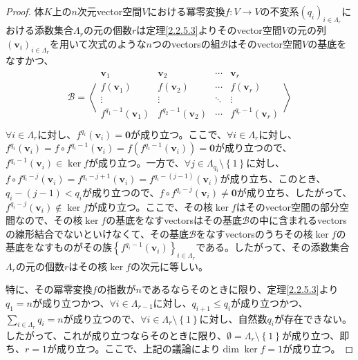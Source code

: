 \documentclass[dvipdfmx]{jsarticle}
\begin{document}
\begin{proof}
体$K$上の$n$次元vector空間$V$における冪零変換$f:V \rightarrow V$の不変系$\left( q_{i} \right)_{i \in \varLambda_{r}}$における添数集合$\varLambda_{r}$の元の個数$r$は定理\ref{2.2.5.3}よりそのvector空間$V$の元の列$\left( \mathbf{v}_{i} \right)_{i \in \varLambda_{r}}$を用いて次式のような$n$つのvectorsの組$\mathcal{B}$はそのvector空間$V$の基底をなすかつ、
\begin{align*}
\mathcal{B} = \left\langle \begin{matrix}
\mathbf{v}_{1} & \mathbf{v}_{2} & \cdots & \mathbf{v}_{r} \\
f\left( \mathbf{v}_{1} \right) & f\left( \mathbf{v}_{2} \right) & \cdots & f\left( \mathbf{v}_{r} \right) \\
 \vdots & \vdots & \ddots & \vdots \\
f^{q_{1} - 1}\left( \mathbf{v}_{1} \right) & f^{q_{2} - 1}\left( \mathbf{v}_{2} \right) & \cdots & f^{q_{r} - 1}\left( \mathbf{v}_{r} \right) \\
\end{matrix} \right\rangle
\end{align*}
$\forall i \in \varLambda_{r}$に対し、$f^{q_{i}}\left( \mathbf{v}_{i} \right) = \mathbf{0}$が成り立つ。ここで、$\forall i \in \varLambda_{r}$に対し、$f^{q_{i}}\left( \mathbf{v}_{i} \right) = f \circ f^{q_{i} - 1}\left( \mathbf{v}_{i} \right) = f\left( f^{q_{i} - 1}\left( \mathbf{v}_{i} \right) \right) = \mathbf{0}$が成り立つので、$f^{q_{i} - 1}\left( \mathbf{v}_{i} \right) \in \ker f$が成り立つ。一方で、$\forall j \in \varLambda_{q_{i}} \setminus \left\{ 1 \right\}$に対し、$f \circ f^{q_{i} - j}\left( \mathbf{v}_{i} \right) = f^{q_{i} - j + 1}\left( \mathbf{v}_{i} \right) = f^{q_{i} - (j - 1)}\left( \mathbf{v}_{i} \right)$が成り立ち、このとき、$q_{i} - (j - 1) < q_{i}$が成り立つので、$f \circ f^{q_{i} - j}\left( \mathbf{v}_{i} \right) \neq \mathbf{0}$が成り立ち、したがって、$f^{q_{i} - j}\left( \mathbf{v}_{i} \right) \notin \ker f$が成り立つ。ここで、その核$\ker f$はそのvector空間の部分空間なので、その核$\ker f$の基底をなすvectorsはその基底$\mathcal{B}$の中に含まれるvectorsの線形結合でないといけなくて、その基底$\mathcal{B}$をなすvectorsのうちその核$\ker f$の基底をなすものがその族$\left\{ f^{q_{i} - 1}\left( \mathbf{v}_{i} \right)\right\}_{i \in \varLambda_{r}} $である。したがって、その添数集合$\varLambda_{r}$の元の個数$r$はその核$\ker f$の次元に等しい。\par
特に、その冪零変換$f$の指数が$n$であるならそのときに限り、定理\ref{2.2.5.3}より$q_{1} = n$が成り立つかつ、$\forall i \in \varLambda_{r - 1}$に対し、$q_{i + 1} \leq q_{i}$が成り立つかつ、$\sum_{i \in \varLambda_{r}} q_{i} = n$が成り立つので、$\forall i \in \varLambda_{r} \setminus \left\{ 1 \right\}$に対し、自然数$q_{i}$が存在できない。したがって、これが成り立つならそのときに限り、$\emptyset = \varLambda_{r} \setminus \left\{ 1 \right\}$が成り立つ、即ち、$r = 1$が成り立つ。ここで、上記の議論により$\dim{\ker f} = 1$が成り立つ。
\end{proof}
\end{document}
